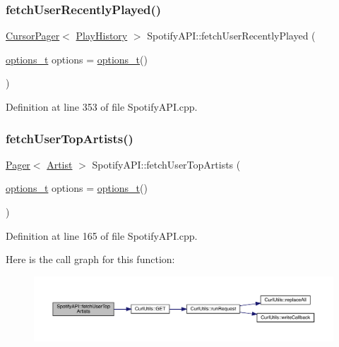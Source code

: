 \subsubsection{\texorpdfstring{fetch\+User\+Recently\+Played()}{fetchUserRecentlyPlayed()}}
{\footnotesize\ttfamily \mbox{\hyperlink{class_cursor_pager}{Cursor\+Pager}}$<$ \mbox{\hyperlink{class_play_history}{Play\+History}} $>$ Spotify\+A\+P\+I\+::fetch\+User\+Recently\+Played (\begin{DoxyParamCaption}\item[{\mbox{\hyperlink{_spotify_a_p_i_8h_a0ff5cac1a4007bb330b7d9939650c283}{options\+\_\+t}}}]{options = {\ttfamily \mbox{\hyperlink{_spotify_a_p_i_8h_a0ff5cac1a4007bb330b7d9939650c283}{options\+\_\+t}}()} }\end{DoxyParamCaption})}



Definition at line 353 of file Spotify\+A\+P\+I.\+cpp.

\mbox{\label{class_spotify_a_p_i_ac505c806265073b2418691799e3573c2}} 
\subsubsection{\texorpdfstring{fetch\+User\+Top\+Artists()}{fetchUserTopArtists()}}
{\footnotesize\ttfamily \mbox{\hyperlink{class_pager}{Pager}}$<$ \mbox{\hyperlink{class_artist}{Artist}} $>$ Spotify\+A\+P\+I\+::fetch\+User\+Top\+Artists (\begin{DoxyParamCaption}\item[{\mbox{\hyperlink{_spotify_a_p_i_8h_a0ff5cac1a4007bb330b7d9939650c283}{options\+\_\+t}}}]{options = {\ttfamily \mbox{\hyperlink{_spotify_a_p_i_8h_a0ff5cac1a4007bb330b7d9939650c283}{options\+\_\+t}}()} }\end{DoxyParamCaption})}



Definition at line 165 of file Spotify\+A\+P\+I.\+cpp.

Here is the call graph for this function\+:
\nopagebreak
\begin{figure}[H]
\begin{center}
\leavevmode
\includegraphics[width=350pt]{class_spotify_a_p_i_ac505c806265073b2418691799e3573c2_cgraph}
\end{center}
\end{figure}
\mbox{\label{class_spotify_a_p_i_a6a15e5d679338e4bc8de8b6e74825d9c}} 
